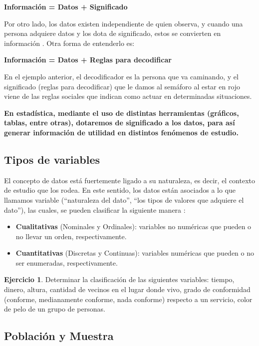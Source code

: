 \documentclass[
  11pt,
]{book}
\providecommand{\tightlist}{%
  \setlength{\itemsep}{0pt}\setlength{\parskip}{0pt}}
\theoremstyle{definition}
\theoremstyle{definition}
\theoremstyle{definition}
\newtheorem{exercise}{Ejercicio}[chapter]
\theoremstyle{definition}
\theoremstyle{remark}
\begin{document}
\textbf{Información = Datos + Significado}

Por otro lado, los datos existen independiente de quien observa, y cuando una persona adquiere datos y los dota de significado, estos se convierten en información \citep{brachman_knowledge_2004}. Otra forma de entenderlo es:

\textbf{Información = Datos + Reglas para decodificar}

En el ejemplo anterior, el decodificador es la persona que va caminando, y el significado (reglas para decodificar) que le damos al semáforo al estar en rojo viene de las reglas sociales que indican como actuar en determinadas situaciones.

\textbf{En estadística, mediante el uso de distintas herramientas (gráficos, tablas, entre otras), dotaremos de significado a los datos, para así generar información de utilidad en distintos fenómenos de estudio.}

\subsection{Tipos de variables}\label{tipos-de-variables}

El concepto de datos está fuertemente ligado a su naturaleza, es decir, el contexto de estudio que los rodea. En este sentido, los datos están asociados a lo que llamamos variable (``naturaleza del dato'', ``los tipos de valores que adquiere el dato''), las cuales, se pueden clasificar la siguiente manera \citep[página 7]{anderson}:

\begin{itemize}
\tightlist
\item
  \textbf{Cualitativas} (Nominales y Ordinales): variables no numéricas que pueden o no llevar un orden, respectivamente.
\item
  \textbf{Cuantitativas} (Discretas y Continuas): variables numéricas que pueden o no ser enumeradas, respectivamente.
\end{itemize}

\begin{exercise}
Determinar la clasificación de las siguientes variables: tiempo, dinero, altura, cantidad de vecinos en el lugar donde vivo, grado de conformidad (conforme, medianamente conforme, nada conforme) respecto a un servicio, color de pelo de un grupo de personas.
\end{exercise}

\subsection{Población y Muestra}\label{poblaciuxf3n-y-muestra}
\end{document}
